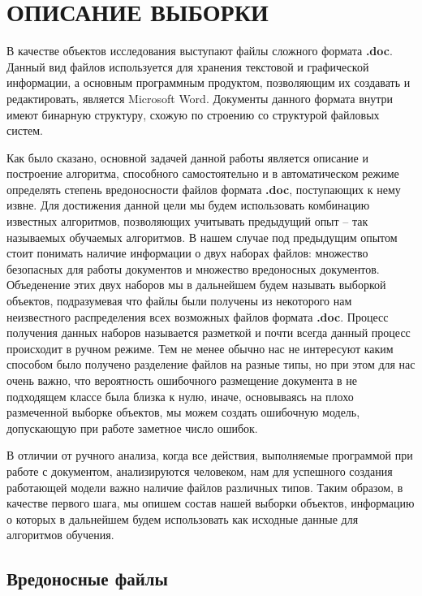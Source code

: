 \chapter{ОПИСАНИЕ ВЫБОРКИ}

В качестве объектов исследования выступают файлы сложного формата \textbf{.doc}.
Данный вид файлов используется для хранения текстовой и графической информации, а основным программным продуктом, позволяющим их создавать и редактировать, является Microsoft Word.
Документы данного формата внутри имеют бинарную структуру, схожую по строению со структурой файловых систем. \cite{doc_format}

Как было сказано, основной задачей данной работы является описание и построение алгоритма, способного самостоятельно и в автоматическом режиме определять степень вредоносности файлов формата \textbf{.doc}, поступающих к нему извне.
Для достижения данной цели мы будем использовать комбинацию известных алгоритмов, позволяющих учитывать предыдущий опыт -- так называемых обучаемых алгоритмов.
В нашем случае под предыдущим опытом стоит понимать наличие информации о двух наборах файлов: множество безопасных для работы документов и множество вредоносных документов.
Объеденение этих двух наборов мы в дальнейшем будем называть выборкой объектов, подразумевая что файлы были получены из некоторого нам неизвестного распределения всех возможных файлов формата \textbf{.doc}. 
Процесс получения данных наборов называется разметкой и почти всегда данный процесс происходит в ручном режиме.
Тем не менее обычно нас не интересуют каким способом было получено разделение файлов на разные типы, но при этом для нас очень важно, что вероятность ошибочного размещение документа в не подходящем классе была близка к нулю, иначе, основываясь на плохо размеченной выборке объектов, мы можем создать ошибочную модель, допускающую при работе заметное число ошибок.

В отличии от ручного анализа, когда все действия, выполняемые программой при работе с документом, анализируются человеком, нам для успешного создания работающей модели важно наличие файлов различных типов.
Таким образом, в качестве первого шага, мы опишем состав нашей выборки объектов, информацию о которых в дальнейшем будем использовать как исходные данные для алгоритмов обучения.

\section{Вредоносные файлы}

